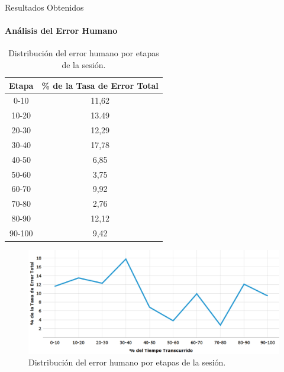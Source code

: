 \begin{frame}{Resultados Obtenidos}
\framesubtitle{Análisis del Error Humano}
\begin{table}[H]
\centering
\footnotesize
\begin{tabular}{|c|c|}
\hline
    Etapa & \% de la Tasa de Error Total \\
    \hline
0-10  &  11,62 \\
10-20 &  13.49 \\
20-30 &  12,29 \\
30-40 &  17,78 \\
40-50 &  6,85 \\
50-60 &  3,75 \\
60-70 &  9,92 \\
70-80 &  2,76 \\
80-90 &  12,12 \\
90-100 & 9,42 \\
    \hline
\end{tabular}
\caption{Distribuci\'on del error humano por etapas de la sesi\'on.}
\label{sec:error-tiempo}
\end{table}

\begin{figure}[ht]
\centering
\includegraphics[width=0.8\linewidth]{./graphics/error_tiempo.png}
\caption{Distribuci\'on del error humano por etapas de la sesi\'on.}
\label{figure:gerror-tiempo}
\end{figure}


\end{frame}

